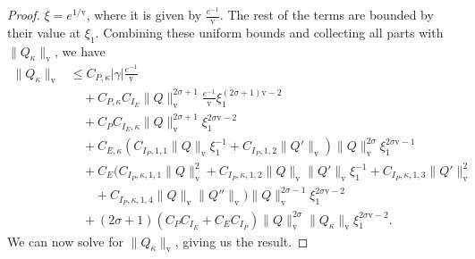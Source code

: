 \documentclass[11pt]{article}
\newcommand{\normv}{\mathrm{v}}
\begin{document}
\begin{proof}
  \(\xi = e^{1 / \normv}\), where it is given by
  \(\frac{e^{-1}}{\normv}\). The rest of the terms are bounded by
  their value at \(\xi_{1}\). Combining these uniform bounds and
  collecting all parts with \(\|Q_\kappa\|_\normv\), we have
  \begin{align*}
    \|Q_{\kappa}\|_{\normv}
    &\leq C_{P,\kappa}|\gamma|\frac{e^{-1}}{\normv}\\
    &\quad+ C_{P,\kappa}C_{I_{E}}
      \|Q\|_{\normv}^{2\sigma + 1}\frac{e^{-1}}{\normv}\xi_{1}^{(2\sigma + 1)\normv - 2}\\
    &\quad+ C_{P}C_{I_{E},\kappa}
      \|Q\|_{\normv}^{2\sigma + 1}\xi_{1}^{2\sigma\normv - 2}\\
    &\quad+ C_{E,\kappa}
      (C_{I_{P},1,1}\|Q\|_{\normv}\xi_{1}^{-1} + C_{I_{P},1,2}\|Q'\|_{\normv})\|Q\|_{\normv}^{2\sigma}
      \xi_{1}^{2\sigma\normv - 1}\\
    &\quad+ C_{E}\Big(C_{I_{P},\kappa,1,1}\|Q\|_{\normv}^{2}
    + C_{I_{P},\kappa,1,2}\|Q\|_{\normv}\|Q'\|_{\normv}\xi_{1}^{-1}
      + C_{I_{P},\kappa,1,3}\|Q'\|_{\normv}^{2}\\
    &\qquad+ C_{I_{P},\kappa,1,4}\|Q\|_{\normv}\|Q''\|_{\normv}
      \Big)\|Q\|_{\normv}^{2\sigma - 1}\xi_{1}^{2\sigma\normv - 2}\\
    &\quad+ (2\sigma + 1)\left(
      C_{P}C_{I_{E}}
      + C_{E}C_{I_{P}}
      \right)
      \|Q\|_{\normv}^{2\sigma}\|Q_{\kappa}\|_{\normv}\xi_{1}^{2\sigma\normv - 2}.
  \end{align*}
  We can now solve for \(\|Q_{\kappa}\|_{\normv}\), giving us
  the result.
\end{proof}
\end{document}
